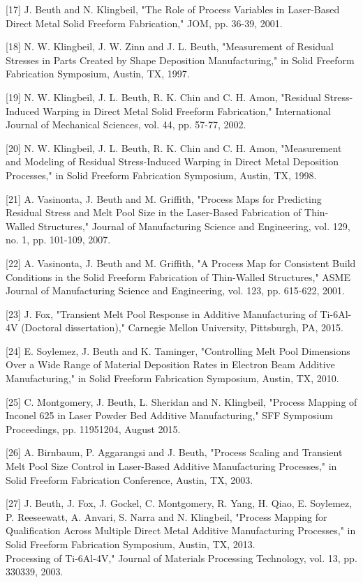 \documentclass[10pt]{article}
\begin{document}
[17] J. Beuth and N. Klingbeil, "The Role of Process Variables in Laser-Based Direct Metal Solid Freeform Fabrication," JOM, pp. 36-39, 2001.

[18] N. W. Klingbeil, J. W. Zinn and J. L. Beuth, "Measurement of Residual Stresses in Parts Created by Shape Deposition Manufacturing," in Solid Freeform Fabrication Symposium, Austin, TX, 1997.

[19] N. W. Klingbeil, J. L. Beuth, R. K. Chin and C. H. Amon, "Residual Stress-Induced Warping in Direct Metal Solid Freeform Fabrication," International Journal of Mechanical Sciences, vol. 44, pp. 57-77, 2002.

[20] N. W. Klingbeil, J. L. Beuth, R. K. Chin and C. H. Amon, "Measurement and Modeling of Residual Stress-Induced Warping in Direct Metal Deposition Processes," in Solid Freeform Fabrication Symposium, Austin, TX, 1998.

[21] A. Vasinonta, J. Beuth and M. Griffith, "Process Maps for Predicting Residual Stress and Melt Pool Size in the Laser-Based Fabrication of Thin-Walled Structures," Journal of Manufacturing Science and Engineering, vol. 129, no. 1, pp. 101-109, 2007.

[22] A. Vasinonta, J. Beuth and M. Griffith, "A Process Map for Consistent Build Conditions in the Solid Freeform Fabrication of Thin-Walled Structures," ASME Journal of Manufacturing Science and Engineering, vol. 123, pp. 615-622, 2001.

[23] J. Fox, "Transient Melt Pool Response in Additive Manufacturing of Ti-6Al-4V (Doctoral dissertation)," Carnegie Mellon University, Pittsburgh, PA, 2015.

[24] E. Soylemez, J. Beuth and K. Taminger, "Controlling Melt Pool Dimensions Over a Wide Range of Material Deposition Rates in Electron Beam Additive Manufacturing," in Solid Freeform Fabrication Symposium, Austin, TX, 2010.

[25] C. Montgomery, J. Beuth, L. Sheridan and N. Klingbeil, "Process Mapping of Inconel 625 in Laser Powder Bed Additive Manufacturing," SFF Symposium Proceedings, pp. 11951204, August 2015.

[26] A. Birnbaum, P. Aggarangsi and J. Beuth, "Process Scaling and Transient Melt Pool Size Control in Laser-Based Additive Manufacturing Processes," in Solid Freeform Fabrication Conference, Austin, TX, 2003.

[27] J. Beuth, J. Fox, J. Gockel, C. Montgomery, R. Yang, H. Qiao, E. Soylemez, P. Reeseewatt, A. Anvari, S. Narra and N. Klingbeil, "Process Mapping for Qualification Across Multiple Direct Metal Additive Manufacturing Processes," in Solid Freeform Fabrication Symposium, Austin, TX, 2013.\\
Processing of Ti-6Al-4V," Journal of Materials Processing Technology, vol. 13, pp. 330339, 2003.
\end{document}

